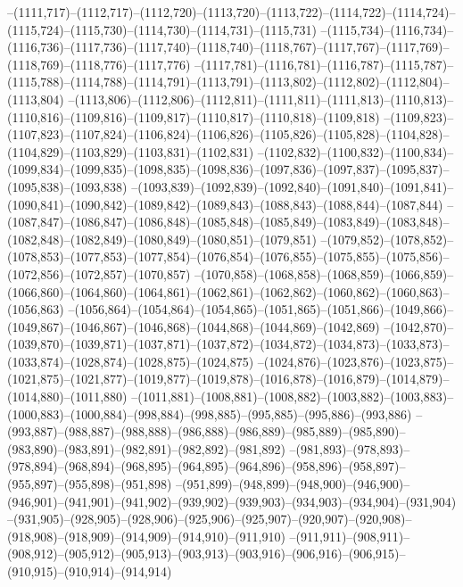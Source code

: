 --(1111,717)--(1112,717)--(1112,720)--(1113,720)--(1113,722)--(1114,722)--(1114,724)--(1115,724)--(1115,730)--(1114,730)--(1114,731)--(1115,731)
--(1115,734)--(1116,734)--(1116,736)--(1117,736)--(1117,740)--(1118,740)--(1118,767)--(1117,767)--(1117,769)--(1118,769)--(1118,776)--(1117,776)
--(1117,781)--(1116,781)--(1116,787)--(1115,787)--(1115,788)--(1114,788)--(1114,791)--(1113,791)--(1113,802)--(1112,802)--(1112,804)--(1113,804)
--(1113,806)--(1112,806)--(1112,811)--(1111,811)--(1111,813)--(1110,813)--(1110,816)--(1109,816)--(1109,817)--(1110,817)--(1110,818)--(1109,818)
--(1109,823)--(1107,823)--(1107,824)--(1106,824)--(1106,826)--(1105,826)--(1105,828)--(1104,828)--(1104,829)--(1103,829)--(1103,831)--(1102,831)
--(1102,832)--(1100,832)--(1100,834)--(1099,834)--(1099,835)--(1098,835)--(1098,836)--(1097,836)--(1097,837)--(1095,837)--(1095,838)--(1093,838)
--(1093,839)--(1092,839)--(1092,840)--(1091,840)--(1091,841)--(1090,841)--(1090,842)--(1089,842)--(1089,843)--(1088,843)--(1088,844)--(1087,844)
--(1087,847)--(1086,847)--(1086,848)--(1085,848)--(1085,849)--(1083,849)--(1083,848)--(1082,848)--(1082,849)--(1080,849)--(1080,851)--(1079,851)
--(1079,852)--(1078,852)--(1078,853)--(1077,853)--(1077,854)--(1076,854)--(1076,855)--(1075,855)--(1075,856)--(1072,856)--(1072,857)--(1070,857)
--(1070,858)--(1068,858)--(1068,859)--(1066,859)--(1066,860)--(1064,860)--(1064,861)--(1062,861)--(1062,862)--(1060,862)--(1060,863)--(1056,863)
--(1056,864)--(1054,864)--(1054,865)--(1051,865)--(1051,866)--(1049,866)--(1049,867)--(1046,867)--(1046,868)--(1044,868)--(1044,869)--(1042,869)
--(1042,870)--(1039,870)--(1039,871)--(1037,871)--(1037,872)--(1034,872)--(1034,873)--(1033,873)--(1033,874)--(1028,874)--(1028,875)--(1024,875)
--(1024,876)--(1023,876)--(1023,875)--(1021,875)--(1021,877)--(1019,877)--(1019,878)--(1016,878)--(1016,879)--(1014,879)--(1014,880)--(1011,880)
--(1011,881)--(1008,881)--(1008,882)--(1003,882)--(1003,883)--(1000,883)--(1000,884)--(998,884)--(998,885)--(995,885)--(995,886)--(993,886)
--(993,887)--(988,887)--(988,888)--(986,888)--(986,889)--(985,889)--(985,890)--(983,890)--(983,891)--(982,891)--(982,892)--(981,892)
--(981,893)--(978,893)--(978,894)--(968,894)--(968,895)--(964,895)--(964,896)--(958,896)--(958,897)--(955,897)--(955,898)--(951,898)
--(951,899)--(948,899)--(948,900)--(946,900)--(946,901)--(941,901)--(941,902)--(939,902)--(939,903)--(934,903)--(934,904)--(931,904)
--(931,905)--(928,905)--(928,906)--(925,906)--(925,907)--(920,907)--(920,908)--(918,908)--(918,909)--(914,909)--(914,910)--(911,910)
--(911,911)--(908,911)--(908,912)--(905,912)--(905,913)--(903,913)--(903,916)--(906,916)--(906,915)--(910,915)--(910,914)--(914,914)

